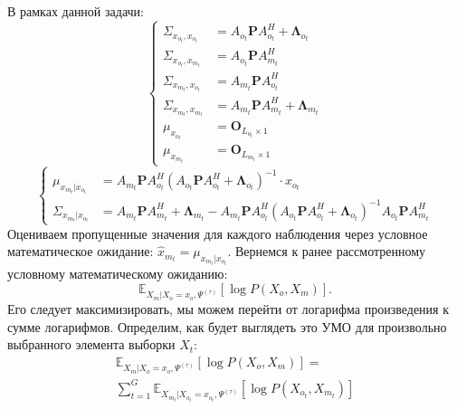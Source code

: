 \documentclass[11pt]{article}
\newcommand{\Expect}{\mathbb{E}}
\begin{document}
В рамках данной задачи:
\begin{equation}
\left\{ \begin{aligned} 
\Sigma_{x_{o_t},x_{o_t}} &= A_{o_t}\mathbf{P} A_{o_t}^H +\mathbf{\Lambda}_{o_t} \\
\Sigma_{x_{o_t},x_{m_t}} &= A_{o_t}\mathbf{P} A_{m_t}^H \\
\Sigma_{x_{m_t},x_{o_t}} &= A_{m_t}\mathbf{P} A_{o_t}^H \\
\Sigma_{x_{m_t},x_{m_t}} &= A_{m_t}\mathbf{P} A_{m_t}^H + \mathbf{\Lambda}_{m_t} \\
\mu_{x_{o_t}}&=\mathbf{O}_{L_{o_t} \times 1} \\
\mu_{x_{m_t}}&=\mathbf{O}_{L_{m_t} \times 1}
\end{aligned} \right.
\end{equation}
\begin{equation}
\left\{ 
\begin{aligned}
 \mu_{x_{m_t}|x_{o_t}} &= A_{m_t}\mathbf{P} A_{o_t}^H(A_{o_t}\mathbf{P} A_{o_t}^H + \mathbf{\Lambda}_{o_t})^{-1}\cdot x_{o_t} \\
\Sigma_{x_{m_t}|x_{o_t}} &= A_{m_t}\mathbf{P} A_{m_t}^H + \mathbf{\Lambda}_{m_t}-A_{m_t}\mathbf{P} A_{o_t}^H(A_{o_t}\mathbf{P} A_{o_t}^H + \mathbf{\Lambda}_{o_t})^{-1}A_{o_t}\mathbf{P} A_{m_t}^H
\end{aligned}
\right.
\end{equation}
Оцениваем пропущенные значения для каждого наблюдения через условное математическое ожидание:
$\hat{x}_{m_t} = \mu_{x_{m_t}|x_{o_t}}$.
Вернемся к ранее рассмотренному условному математическому ожиданию:
\begin{equation*}
 \Expect_{X_m|X_o=x_o, \Psi^{(\tau)}}[\log P(X_o, X_m)].
\end{equation*}
Его следует максимизировать, мы можем перейти от логарифма произведения к сумме логарифмов. Определим, как будет выглядеть это УМО для произвольно выбранного элемента выборки $X_t$:
\begin{equation*}
\begin{gathered}
 \Expect_{X_m|X_o=x_o, \Psi^{(\tau)}}[\log P(X_o, X_m)] = \\
 \sum_{t=1}^G\Expect_{X_{m_t}|X_{o_t}=x_{o_t}, \Psi^{(\tau)}}[\log P(X_{o_t}, X_{m_t})]
\end{gathered}
\end{equation*}
\\
\\
\end{document}
